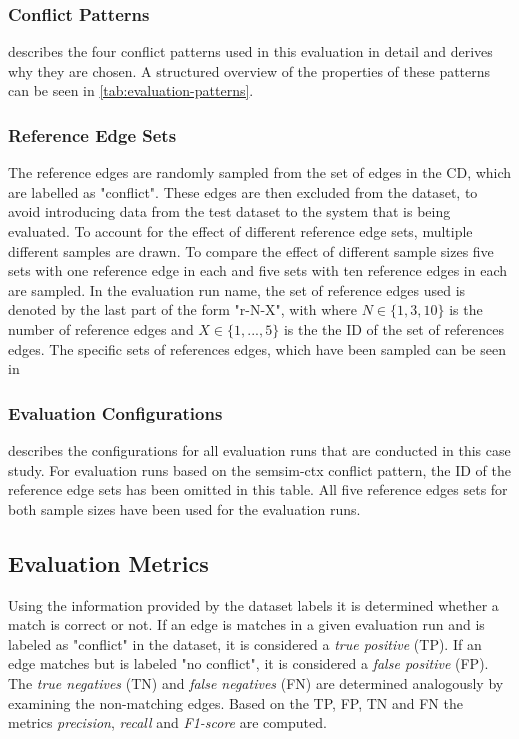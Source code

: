 \documentclass[11pt]{scrreprt}
\begin{document}

\subsubsection{Conflict Patterns}
 describes the four conflict patterns used in this evaluation in detail and derives why they are chosen. A structured overview of the properties of these patterns can be seen in \cref{tab:evaluation-patterns}. 

\subsubsection{Reference Edge Sets}
The reference edges are randomly sampled from the set of edges in the CD, which are labelled as "conflict". These edges are then excluded from the dataset, to avoid introducing data from the test dataset to the system that is being evaluated. To account for the effect of different reference edge sets, multiple different samples are drawn. To compare the effect of different sample sizes five sets with one reference edge in each and five sets with ten reference edges in each are sampled. In the evaluation run name, the set of reference edges used is denoted by the last part of the form "r-N-X", with where \(N \in \{1, 3, 10\}\) is the number of reference edges and \(X \in \{1, ..., 5\}\) is the the ID of the set of references edges. The specific sets of references edges, which have been sampled can be seen in 

\subsubsection{Evaluation Configurations}
 describes the configurations for all evaluation runs that are conducted in this case study. For evaluation runs based on the semsim-ctx conflict pattern, the ID of the reference edge sets has been omitted in this table. All five reference edges sets for both sample sizes have been used for the evaluation runs.

\subsection{Evaluation Metrics}
Using the information provided by the dataset labels it is determined whether a match is correct or not. If an edge is matches in a given evaluation run and is labeled as "conflict" in the dataset, it is considered a \textit{true positive} (TP). If an edge matches but is labeled "no conflict", it is considered a \textit{false positive} (FP). The \textit{true negatives} (TN) and \textit{false negatives} (FN) are determined analogously  by examining the non-matching edges. Based on the TP, FP, TN and FN the metrics \textit{precision}, \textit{recall} and \textit{F1-score} are computed.
\end{document}
